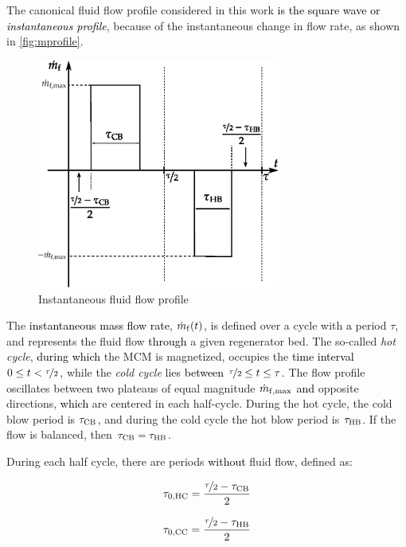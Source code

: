 \documentclass[referee]{svjour3}
\begin{document}
The canonical fluid flow profile considered in this work \textcolor{black}{ is the square wave or \emph{instantaneous profile}}, because of the instantaneous change in flow rate, as shown in \autoref{fig:mprofile}. 

\begin{figure}[!ht]
  \centering
  \includegraphics[width=8cm]{mprofile}
  \caption{Instantaneous fluid flow profile}
  \label{fig:mprofile}
\end{figure}

The \textcolor{black}{instantaneous mass flow rate}, \(\dot{m}_{\mathrm{f}}(t)\), is defined over a cycle with \textcolor{black}{a} period \(\tau\), and represents the fluid flow \textcolor{black}{through} a given regenerator bed. The so-called \emph{hot cycle}, \textcolor{black}{during which} the MCM is magnetized, occupies the \textcolor{black}{time interval} \(0 \le t < \nicefrac{\tau}{2}\), while the \emph{cold cycle}
lies \textcolor{black}{between} \(\nicefrac{\tau}{2} \le t \le \tau\). The flow profile oscillates between two plateaus of equal magnitude
\(\dot{m}_{\mathrm{f,max}}\) \textcolor{black}{and} opposite directions, \textcolor{black}{which} are centered in each half-cycle. During the hot cycle, the cold
blow period is \(\tau_{\mathrm{CB}}\), and during the cold cycle the hot blow period is \(\tau_{\mathrm{HB}}\). If the flow is balanced, then \(\tau_{\mathrm{CB}} = \tau_{\mathrm{HB}}\).


During each half cycle, there are periods \textcolor{black}{without}  fluid flow, defined as:

\begin{equation}
\label{eq:48}
\tau_{\mathrm{0,HC}} = \frac{\nicefrac{\tau}{2} - \tau_{\mathrm{CB}}}{2}
\end{equation}

\begin{equation}
\label{eq:49}
\tau_{\mathrm{0,CC}} = \frac{\nicefrac{\tau}{2} - \tau_{\mathrm{HB}}}{2}
\end{equation}
\end{document}
